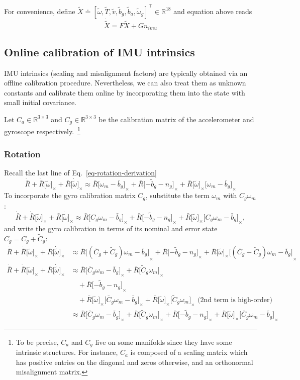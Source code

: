 \documentclass[letter,10pt]{article}
\newcommand{\real}{\mathbb{R}}
\newcommand{\asym}[1]{{\lbrack #1\rbrack}_\times{}}
\begin{document}
For convenience, define $\tilde X \doteq [\tilde \omega, \tilde T, \tilde v, \tilde b_g, \tilde b_a, \tilde\omega_g]^\top \in \real^{18}$ and equation above reads
\begin{equation}
\dot{\tilde X} = F \tilde X + G n_{imu}
\end{equation}

\subsection{Online calibration of IMU intrinsics}
IMU intrinsics (scaling and misalignment factors) are typically obtained via an offline calibration procedure. Nevertheless, we can also treat them as unknown constants and calibrate them online by incorporating them into the state with small initial covariance. 

Let $C_a\in\real^{3\times 3}$ and $C_g\in\real^{3 \times 3}$ be the calibration matrix of the accelerometer and gyroscope respectively.~\footnote{To be precise, $C_a$ and $C_g$ live on some manifolds since they have some intrinsic structures. For instance, $C_a$ is composed of a scaling matrix which has positive entries on the diagonal and zeros otherwise, and an orthonormal misalignment matrix.}

\subsubsection{Rotation}
Recall the last line of Eq.~\eqref{eq-rotation-derivation}
$$
 \dot{\bar R} + \dot{\bar R} \asym{\tilde \omega} + \bar R \asym{\dot{\tilde\omega}} \approx \bar R\asym{\omega_m-\bar b_g} + \bar R\asym{-\tilde b_g - n_g} + \bar R \asym{\tilde \omega}\asym{\omega_m-\bar b_g}
$$
To incorporate the gyro calibration matrix $C_g$, substitute the term $\omega_m$ with $C_g\omega_m$:
$$
 \dot{\bar R} + \dot{\bar R} \asym{\tilde \omega} + \bar R \asym{\dot{\tilde\omega}} \approx \bar R\asym{C_g\omega_m-\bar b_g} + \bar R\asym{-\tilde b_g - n_g} + \bar R \asym{\tilde \omega}\asym{C_g\omega_m-\bar b_g},
$$
and write the gyro calibration in terms of its nominal and error state $C_g=\bar C_g + \tilde C_g$:
\begin{align}
 \dot{\bar R} + \dot{\bar R} \asym{\tilde \omega} + \bar R \asym{\dot{\tilde\omega}}
  &\approx \bar R\asym{(\bar C_g + \tilde C_g)\omega_m-\bar b_g} + \bar R\asym{-\tilde b_g - n_g} + \bar R \asym{\tilde \omega}\asym{(\bar C_g + \tilde C_g)\omega_m-\bar b_g}\\
 \dot{\bar R} + \dot{\bar R} \asym{\tilde \omega} + \bar R \asym{\dot{\tilde\omega}}
  &\approx 
  \bar R\asym{\bar C_g\omega_m-\bar b_g} 
  + \bar R\asym{\tilde C_g\omega_m} \\
  & \quad + \bar R\asym{-\tilde b_g - n_g}  \\
  & \quad + \bar R \asym{\tilde \omega}\asym{\bar C_g\omega_m-\bar b_g}
  + \bar R \asym{\tilde \omega}\asym{\tilde C_g\omega_m} \text{ (2nd term is high-order)}\\
  &\approx
  \bar R\asym{\bar C_g\omega_m-\bar b_g} + \bar R\asym{\tilde C_g\omega_m}
  + \bar R\asym{-\tilde b_g - n_g} + \bar R \asym{\tilde \omega}\asym{\bar C_g\omega_m-\bar b_g}
\end{align}
\end{document}
